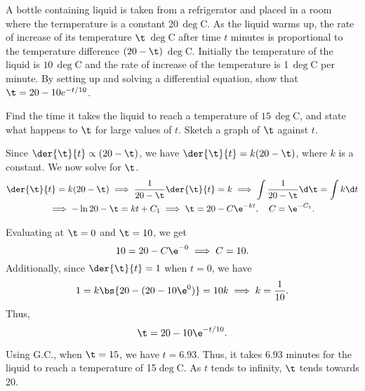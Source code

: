 \begin{problem}
    A bottle containing liquid is taken from a refrigerator and placed in a room where the termperature is a constant 20\,$\deg$C. As the liquid warms up, the rate of increase of its temperature $\t$\,$\deg$C after time $t$ minutes is proportional to the temperature difference $(20-\t)$\,$\deg$C. Initially the temperature of the liquid is $10$\,$\deg$C and the rate of increase of the temperature is 1\,$\deg$C per minute. By setting up and solving a differential equation, show that $\t = 20 - 10e^{-t/10}$.

    Find the time it takes the liquid to reach a temperature of $15$\,$\deg$C, and state what happens to $\t$ for large values of $t$. Sketch a graph of $\t$ against $t$.
\end{problem}
\begin{solution}
    Since $\der{\t}{t} \propto (20 - \t)$, we have $\der{\t}{t} = k(20 - \t)$, where $k$ is a constant. We now solve for $\t$.
    \begin{gather*}
        \der{\t}{t} = k(20 - \t) \implies \frac1{20 - \t} \der{\t}{t} = k \implies \int \frac1{20 - \t} \d \t = \int k \d t \\
        \implies - \ln{20 - \t} = kt + C_1 \implies \t = 20 - C\e^{-kt}, \quad C = \e^{-C_1}.
    \end{gather*}

    Evaluating at $\t = 0$ and $\t = 10$, we get \[10 = 20 - C\e^{-0} \implies C = 10.\] Additionally, since $\der{\t}{t} = 1$ when $t = 0$, we have \[1 = k\bs{20 - (20 - 10\e^0)} = 10k \implies k = \frac1{10}.\] Thus, \[\t = 20 - 10\e^{-t/10}.\]

    Using G.C., when $\t = 15$, we have $t = 6.93$. Thus, it takes 6.93 minutes for the liquid to reach a temperature of 15$\deg$C. As $t$ tends to infinity, $\t$ tends towards 20.

    \begin{center}
    \end{center}
\end{solution}

